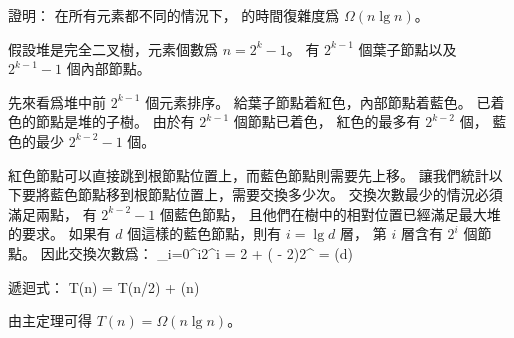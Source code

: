 \startEXERCISE\DIFFICULT
證明： 在所有元素都不同的情況下，  的時間復雜度爲 $\Omega(n\lg{n})$。
\stopEXERCISE

\startANSWER
假設堆是完全二叉樹，元素個數爲 $n=2^k - 1$。
有 $2^{k-1}$ 個葉子節點以及 $2^{k-1} - 1$ 個內部節點。

先來看爲堆中前 $2^{k-1}$ 個元素排序。
給葉子節點着紅色，內部節點着藍色。
已着色的節點是堆的子樹。
由於有 $2^{k-1}$ 個節點已着色，
紅色的最多有 $2^{k-2}$ 個，
藍色的最少 $2^{k-2}-1$ 個。

紅色節點可以直接跳到根節點位置上，而藍色節點則需要先上移。
讓我們統計以下要將藍色節點移到根節點位置上，需要交換多少次。
交換次數最少的情況必須滿足兩點，
有 $2^{k-2} -1$ 個藍色節點，
且他們在樹中的相對位置已經滿足最大堆的要求。
如果有 $d$ 個這樣的藍色節點，則有 $i=\lg{d}$ 層，
第 $i$ 層含有 $2^i$ 個節點。
因此交換次數爲：
\startformula
\sum_{i=0}^{}i2^i = 2 + ( - 2)2^{} = \Omega(d)
\stopformula

遞迴式：
\startformula
T(n) = T(n/2) + \Omega(n)
\stopformula

由主定理可得 $T(n)=\Omega(n\lg{n})$。
\stopANSWER
